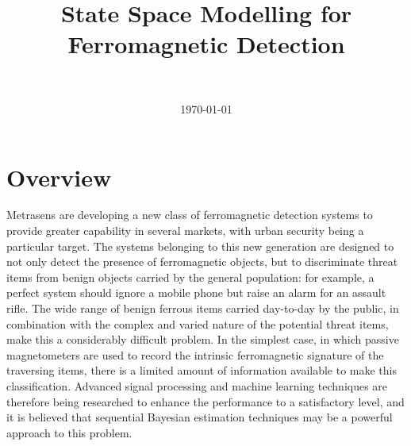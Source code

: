 \documentclass[10pt, a4paper, twocolumn]{article} %
\title{State Space Modelling for Ferromagnetic Detection} %
\author{
	\authorstyle{Richard Hodgskin-Brown} %
	\newline\newline %
	\metdisclaimer{Commercial in Confidence $|$ \copyright \ Metrasens Ltd. 2022}\\ %
}
\date{\today} %
\begin{document}
\maketitle %

\thispagestyle{firstpage} %





\section{Overview}

Metrasens are developing a new class of ferromagnetic detection systems to provide greater capability in several markets, with urban security being a particular target. The systems belonging to this new generation are designed to not only detect the presence of ferromagnetic objects, but to discriminate threat items from benign objects carried by the general population: for example, a perfect system should ignore a mobile phone but raise an alarm for an assault rifle. The wide range of benign ferrous items carried day-to-day by the public, in combination with the complex and varied nature of the potential threat items, make this a considerably difficult problem. In the simplest case, in which passive magnetometers are used to record the intrinsic ferromagnetic signature of the traversing items, there is a limited amount of information available to make this classification. Advanced signal processing and machine learning techniques are therefore being researched to enhance the performance to a satisfactory level, and it is believed that sequential Bayesian estimation techniques may be a powerful approach to this problem.
\end{document}
